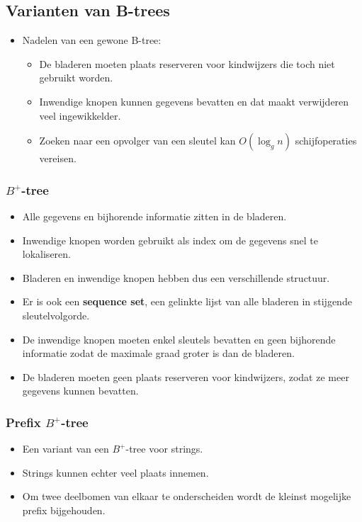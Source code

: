 \subsection{Varianten van B-trees}
\begin{itemize}
    \item Nadelen van een gewone B-tree:
    \begin{itemize}
        \item De bladeren moeten plaats reserveren voor kindwijzers die toch niet gebruikt worden.
        \item Inwendige knopen kunnen gegevens bevatten en dat maakt verwijderen veel ingewikkelder.
        \item Zoeken naar een opvolger van een sleutel kan $O(\log_g n)$ schijfoperaties vereisen.
    \end{itemize}
\end{itemize}
\subsubsection{$B^+$-tree}
\begin{itemize}
    \item Alle gegevens en bijhorende informatie zitten in de bladeren.
    \item Inwendige knopen worden gebruikt als index om de gegevens snel te lokaliseren.
    \item Bladeren en inwendige knopen hebben dus een verschillende structuur.
    \item Er is ook een \textbf{sequence set}, een gelinkte lijst van alle bladeren in stijgende sleutelvolgorde.
    \item De inwendige knopen moeten enkel sleutels bevatten en geen bijhorende informatie zodat de maximale graad groter is dan de bladeren.
    \item De bladeren moeten geen plaats reserveren voor kindwijzers, zodat ze meer gegevens kunnen bevatten.
\end{itemize}
\subsubsection{Prefix $B^+$-tree}
\begin{itemize}
    \item Een variant van een $B^+$-tree voor strings.
    \item Strings kunnen echter veel plaats innemen.
    \item Om twee deelbomen van elkaar te onderscheiden wordt de kleinst mogelijke prefix bijgehouden.
\end{itemize}
